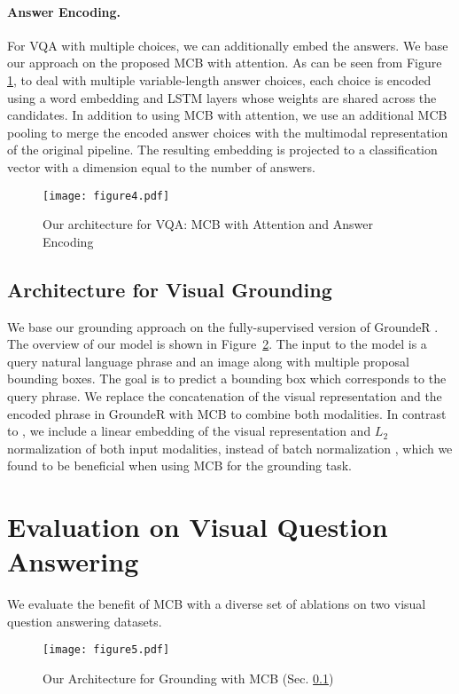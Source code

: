 \documentclass[11pt,letterpaper]{article}
\DeclareRobustCommand{\Figref}[1]{Figure~\ref{#1}}
\newcommand{\myparagraph}[1]{\paragraph{#1}}
\begin{document}
\myparagraph{Answer Encoding.}
\label{sec:architecture:visual7w}
For VQA with multiple choices, we can additionally embed the answers. We base our approach on the proposed MCB with attention. As can be seen from Figure \ref{fig:model_7w}, to deal with multiple variable-length answer choices, each choice is encoded using a word embedding and LSTM layers whose weights are shared across the candidates. In addition to using MCB with attention, we use an additional MCB pooling to merge the encoded answer choices with the multimodal representation of the original pipeline. The resulting embedding is projected to a classification vector with a dimension equal to the number of answers. 

\begin{figure}[t]
\texttt{[image: figure4.pdf]}
\vspace{-0.5cm}
\caption{Our architecture for VQA: MCB with Attention and Answer Encoding}
\label{fig:model_7w}
\end{figure}

\subsection{Architecture for Visual Grounding}
\label{sec:architecture:grounding}
We base our grounding approach on the fully-supervised version of GroundeR \cite{rohrbach16arxiv}. The overview of our model is shown in  \Figref{fig:model_grounder}. The input to the model is a query natural language phrase and an image along with multiple proposal bounding boxes. The goal is to predict a bounding box which corresponds to the query phrase. We replace the concatenation of the visual representation and the encoded phrase in GroundeR with MCB to combine both modalities. In contrast to ,  we include a linear embedding of the visual representation and $L_2$ normalization of both input modalities, instead of batch normalization \cite{ioffe2015batch}, which we found to be beneficial when using MCB for the grounding task. 

 
\section{Evaluation on Visual Question Answering}
We evaluate the benefit of MCB  with a diverse set of ablations on two visual question answering datasets. 


\begin{figure}[t]
\texttt{[image: figure5.pdf]}
\vspace{-0.4cm}
\caption{Our Architecture for Grounding with MCB (Sec. \ref{sec:architecture:grounding})}
\label{fig:model_grounder}
\end{figure}
\end{document}
